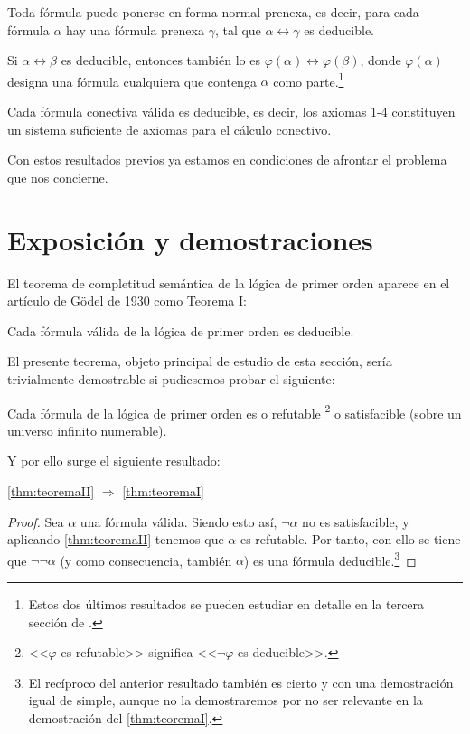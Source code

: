 \begin{lema} \label{lem:lema-5}
    Toda fórmula puede ponerse en forma normal prenexa, es decir, para cada fórmula $\alpha$ hay una fórmula prenexa $\gamma$, tal que $\alpha \leftrightarrow \gamma$ es deducible.
\end{lema}

\begin{lema} \label{lem:lema-6}
    Si $\alpha \leftrightarrow \beta$ es deducible, entonces también lo es $\varphi(\alpha) \leftrightarrow \varphi(\beta)$, 
    donde $\varphi(\alpha)$ designa una fórmula cualquiera que contenga $\alpha$ como parte.\footnote{Estos dos últimos resultados se pueden estudiar 
    en detalle en la tercera sección de \cite{hilbert1962elementos}.}  
\end{lema}

\begin{lema} \label{lem:lema-7}
    Cada fórmula conectiva válida es deducible, es decir, los axiomas 1-4 constituyen un sistema suficiente de axiomas para el cálculo conectivo.
\end{lema}

Con estos resultados previos ya estamos en condiciones de afrontar el problema que nos concierne.


\section{Exposición y demostraciones}

El teorema de completitud semántica de la lógica de primer orden aparece en el artículo de Gödel de 1930 como Teorema I:

\begin{teorema}\label{thm:teoremaI}
    Cada fórmula válida de la lógica de primer orden es deducible.
\end{teorema}

El presente teorema, objeto principal de estudio de esta sección, sería trivialmente demostrable si pudiesemos probar
el siguiente:
\begin{teorema}\label{thm:teoremaII}
    Cada fórmula de la lógica de primer orden es o refutable
    \footnote{<<$\varphi$ es refutable>> significa <<$\lnot \varphi$ es deducible>>.} o satisfacible (sobre un universo infinito numerable).
\end{teorema}

Y por ello surge el siguiente resultado: 

\begin{proposicion}
    \autoref{thm:teoremaII} $\Rightarrow$ \autoref{thm:teoremaI}
\end{proposicion}
\begin{proof}
    Sea $\alpha$ una fórmula válida. Siendo esto así, $\lnot \alpha$ no es satisfacible, y aplicando \autoref{thm:teoremaII} 
    tenemos que $\alpha$ es refutable. Por tanto, con ello se tiene que $\lnot \lnot \alpha$ (y como consecuencia, también $\alpha$) es una fórmula
    deducible.\footnote{El recíproco del anterior resultado también es cierto y con una demostración igual de simple, aunque no la demostraremos por no ser relevante
    en la demostración del \autoref{thm:teoremaI}.}
\end{proof}

